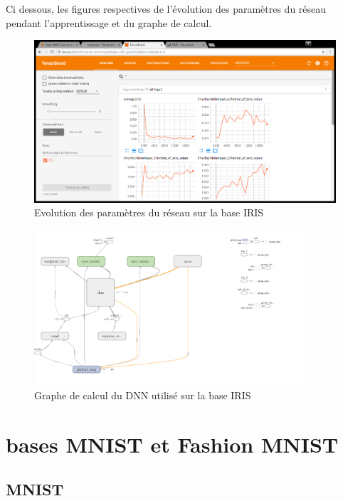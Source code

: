 \documentclass[a4paper,11pt]{book}
\begin{document}
Ci dessous, les figures respectives de l'évolution des paramètres du réseau pendant l'apprentissage et du graphe de calcul.
\begin{figure}[H]

\begin{center}
\includegraphics[width=16cm]{./figures/TensorBoardIrisDnn.png} 
\end{center}
\caption{Evolution des paramètres du réseau sur la base IRIS}
\end{figure}

\begin{figure}[H]

\begin{center}
\includegraphics[width=10cm]{./figures/graphIrisDNN.png} 
\end{center}
\caption{Graphe de calcul du DNN utilisé sur la base IRIS}
\end{figure}

\chapter{bases MNIST et Fashion MNIST}
\section{MNIST}
\end{document}
